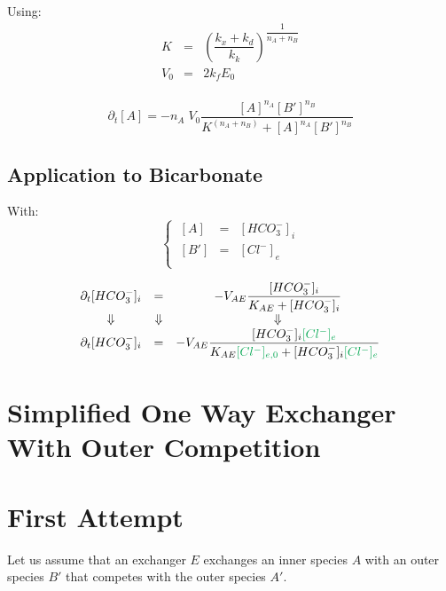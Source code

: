 \documentclass[aps,12pt]{revtex4}
\begin{document}
Using:
\begin{equation}
\begin{array}{rcl}
K & = &  \left(\dfrac{k_x+k_d}{k_k}\right)^{\dfrac{1}{n_A+n_B}}\\
V_0 & = & 2k_fE_0\\
\end{array}
\end{equation}

\begin{equation}
\boxed{
	\partial_t [A] = -n_A \; V_0 \dfrac{[A]^{n_A} [B']^{n_B}}{K^{(n_A+n_B)}+[A]^{n_A} [B']^{n_B}}
	}
\end{equation}

\subsection{Application to Bicarbonate}

With:
\begin{equation}
\left\lbrace
\begin{array}{ccl}
~[A] & = & [HCO_3^-]_i \\
~[B'] & = & [Cl^-]_e\\
\end{array}
\right.
\end{equation}

\begin{equation}
\begin{array}{ccc}
\partial_t [HCO_3^-]_i & = & -V_{AE} \dfrac{[HCO_3^-]_i}{K_{AE} + [HCO_3^-]_i}  \\
\Downarrow & \Downarrow & \Downarrow \\
\partial_t [HCO_3^-]_i & = & -V_{AE} \dfrac{[HCO_3^-]_i\textcolor{Green}{[Cl^-]_e}}{K_{AE} \textcolor{Green}{[Cl^-]_{e,0}}+ [HCO_3^-]_i \textcolor{Green}{[Cl^-]_e}}  \\
\end{array}
\end{equation}

\section{Simplified One Way Exchanger With Outer Competition} 


\section{First Attempt}

Let us assume that an exchanger $E$ exchanges an inner species $A$ with an outer species $B'$ that competes with the outer species $A'$.
\end{document}
